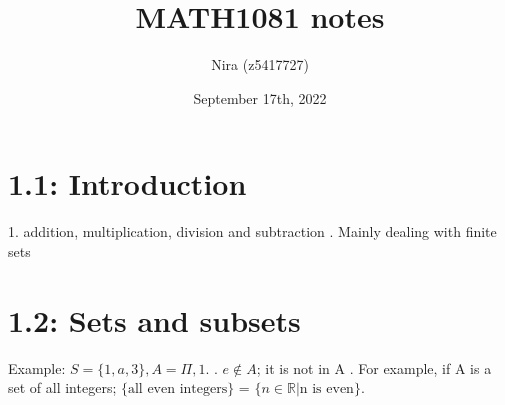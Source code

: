 \documentclass{article}
\title{MATH1081 notes}
\author{Nira (z5417727)}
\date{September 17th, 2022}
\begin{document}
\maketitle 
\tableofcontents
\newpage
\section{1.1: Introduction}
1. addition, multiplication, division and subtraction
. Mainly dealing with finite sets

\newpage
\section{1.2: Sets and subsets}
\newline
\newline
Example: $S = \{1, a, 3\}, A = {\Pi, 1}.$
. $e \notin A$; it is not in A
. For example, if A is a set of all integers; $\{ \text{all even integers} \}$
    = $\{n \in \mathbb{R} | \text{n is even}\}$.
\end{document}
